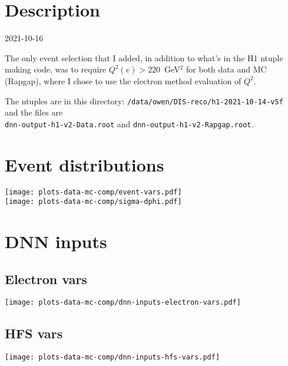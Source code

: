\documentclass[11pt]{article}
\begin{document}


        \tableofcontents

 \pagebreak



\section{ Description }

2021-10-16 \\

\vspace{1cm}

The only event selection that I added, in addition to what's in the H1 ntuple making code,
was to require $Q^2(e) > 220$~GeV$^2$ for both data and MC (Rapgap), where I chose to use
the electron method evaluation of $Q^2$.

The ntuples are in this directory: {\tt /data/owen/DIS-reco/h1-2021-10-14-v5f} \\
and the files are \\
{\tt dnn-output-h1-v2-Data.root} and {\tt dnn-output-h1-v2-Rapgap.root}.


\section{ Event distributions }

\texttt{[image: plots-data-mc-comp/event-vars.pdf]} \\
\texttt{[image: plots-data-mc-comp/sigma-dphi.pdf]}



\section{ DNN inputs }

\subsection{ Electron vars }
\texttt{[image: plots-data-mc-comp/dnn-inputs-electron-vars.pdf]}

\subsection{ HFS vars }
\texttt{[image: plots-data-mc-comp/dnn-inputs-hfs-vars.pdf]}
\end{document}
